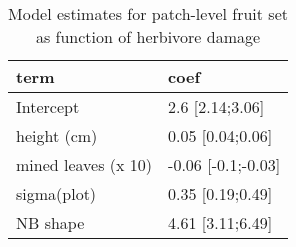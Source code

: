 \begin{table}

\caption{\label{tab:}Model estimates for patch-level fruit set as function of herbivore damage}
\centering
\begin{tabular}[t]{ll}
\toprule
term & coef\\
\midrule
Intercept & 2.6 [2.14;3.06]\\
height (cm) & 0.05 [0.04;0.06]\\
mined leaves (x 10) & -0.06 [-0.1;-0.03]\\
sigma(plot) & 0.35 [0.19;0.49]\\
NB shape & 4.61 [3.11;6.49]\\
\bottomrule
\end{tabular}
\end{table}